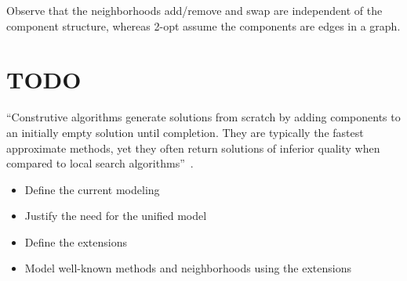 \documentclass[12pt]{llncs}
\begin{document}
Observe that the neighborhoods add/remove and swap are independent of the component structure, whereas 2-opt assume the components are edges in a graph.

\section*{TODO}
``Construtive algorithms generate solutions from scratch by adding components to an initially empty solution until completion. They are typically the fastest approximate methods, yet they often return solutions of inferior quality when compared to local search algorithms''~\citep{stutzle1999local}.
\begin{itemize}
\item Define the current modeling 
\item Justify the need for the unified model
\item Define the extensions
\item Model well-known methods and neighborhoods using the extensions
\end{itemize}

%




\end{document}
